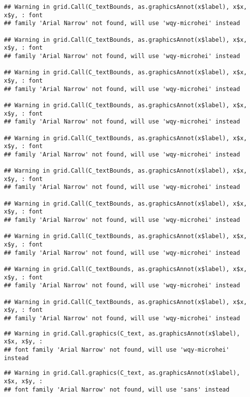 \documentclass[
]{article}
\begin{document}
\begin{verbatim}
## Warning in grid.Call(C_textBounds, as.graphicsAnnot(x$label), x$x, x$y, : font
## family 'Arial Narrow' not found, will use 'wqy-microhei' instead

## Warning in grid.Call(C_textBounds, as.graphicsAnnot(x$label), x$x, x$y, : font
## family 'Arial Narrow' not found, will use 'wqy-microhei' instead

## Warning in grid.Call(C_textBounds, as.graphicsAnnot(x$label), x$x, x$y, : font
## family 'Arial Narrow' not found, will use 'wqy-microhei' instead

## Warning in grid.Call(C_textBounds, as.graphicsAnnot(x$label), x$x, x$y, : font
## family 'Arial Narrow' not found, will use 'wqy-microhei' instead

## Warning in grid.Call(C_textBounds, as.graphicsAnnot(x$label), x$x, x$y, : font
## family 'Arial Narrow' not found, will use 'wqy-microhei' instead

## Warning in grid.Call(C_textBounds, as.graphicsAnnot(x$label), x$x, x$y, : font
## family 'Arial Narrow' not found, will use 'wqy-microhei' instead

## Warning in grid.Call(C_textBounds, as.graphicsAnnot(x$label), x$x, x$y, : font
## family 'Arial Narrow' not found, will use 'wqy-microhei' instead

## Warning in grid.Call(C_textBounds, as.graphicsAnnot(x$label), x$x, x$y, : font
## family 'Arial Narrow' not found, will use 'wqy-microhei' instead

## Warning in grid.Call(C_textBounds, as.graphicsAnnot(x$label), x$x, x$y, : font
## family 'Arial Narrow' not found, will use 'wqy-microhei' instead

## Warning in grid.Call(C_textBounds, as.graphicsAnnot(x$label), x$x, x$y, : font
## family 'Arial Narrow' not found, will use 'wqy-microhei' instead
\end{verbatim}

\begin{verbatim}
## Warning in grid.Call.graphics(C_text, as.graphicsAnnot(x$label), x$x, x$y, :
## font family 'Arial Narrow' not found, will use 'wqy-microhei' instead
\end{verbatim}

\begin{verbatim}
## Warning in grid.Call.graphics(C_text, as.graphicsAnnot(x$label), x$x, x$y, :
## font family 'Arial Narrow' not found, will use 'sans' instead
\end{verbatim}
\end{document}
